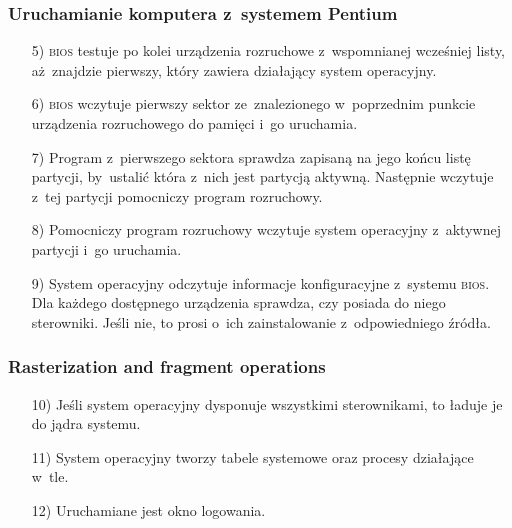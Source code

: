 \documentclass[10pt,t]{beamer}
\begin{document}
\begin{frame}
  \frametitle{Uruchamianie komputera z~systemem Pentium}


  \begin{itemize}

  \item[5)] \textsc{bios} testuje po kolei urządzenia rozruchowe
    z~wspomnianej wcześniej listy, aż~znajdzie pierwszy, który zawiera
    działający system operacyjny.



  \item[6)] \textsc{bios} wczytuje pierwszy sektor ze~znalezionego
    w~poprzednim punkcie urządzenia rozruchowego do pamięci i~go uruchamia.




  \item[7)] Program z~pierwszego sektora sprawdza zapisaną na jego końcu
    listę partycji, by~ustalić która z~nich jest partycją aktywną.
    Następnie wczytuje z~tej partycji pomocniczy program rozruchowy.



  \item[8)] Pomocniczy program rozruchowy wczytuje system operacyjny
    z~aktywnej partycji i~go uruchamia.



  \item[9)] System operacyjny odczytuje informacje konfiguracyjne z~systemu
    \textsc{bios}. Dla każdego dostępnego urządzenia sprawdza, czy posiada
    do niego sterowniki. Jeśli nie, to prosi o~ich zainstalowanie
    z~odpowiedniego źródła.

  \end{itemize}

\end{frame}





\begin{frame}
  \frametitle{Rasterization and fragment operations}


  \begin{itemize}

  \item[10)] Jeśli system operacyjny dysponuje wszystkimi sterownikami,
    to ładuje je do jądra systemu.



  \item[11)] System operacyjny tworzy tabele systemowe oraz procesy
    działające w~tle.



  \item[12)] Uruchamiane jest okno logowania.

  \end{itemize}

\end{frame}
\end{document}
